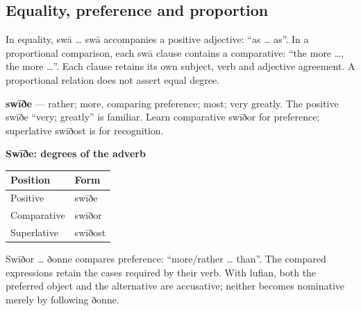 \subsection*{Equality, preference and proportion}

In equality, swā … swā accompanies a positive adjective: “as … as”. In a proportional comparison, each swā clause contains a comparative: “the more …, the more …”. Each clause retains its own subject, verb and adjective agreement. A proportional relation does not assert equal degree.

\textbf{swīðe} — rather; more, comparing preference; most; very greatly. The positive swīðe “very; greatly” is familiar. Learn comparative swīðor for preference; superlative swīðost is for recognition.

\textbf{Swīðe: degrees of the adverb}

\par\begingroup
\fontsize{10.5}{13.2}\selectfont
\setlength{\LTleft}{0pt}\setlength{\LTright}{\fill}
\noindent
\begin{tabular}{@{}>{\raggedright\arraybackslash}p{63.48mm}>{\raggedright\arraybackslash}p{57.71mm}@{}}
\toprule
\textbf{Position} & \textbf{Form} \\
\midrule
Positive & swīðe \\
Comparative & swīðor \\
Superlative & swīðost \\
\bottomrule
\end{tabular}
\par\endgroup

Swīðor … ðonne compares preference: “more/\allowbreak{}rather … than”. The compared expressions retain the cases required by their verb. With lufian, both the preferred object and the alternative are accusative; neither becomes nominative merely by following ðonne.

